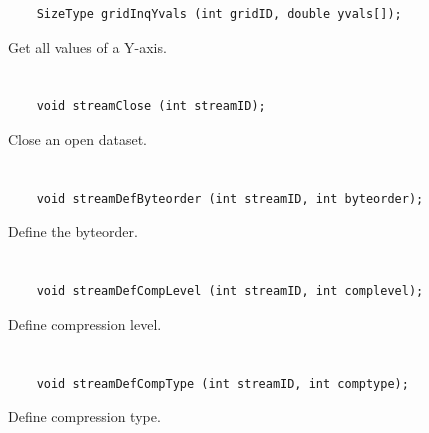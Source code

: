 \begin{verbatim}
    SizeType gridInqYvals (int gridID, double yvals[]);
\end{verbatim}

Get all values of a Y-axis.


\section*{\tt {}}

\begin{verbatim}
    void streamClose (int streamID);
\end{verbatim}

Close an open dataset.


\section*{\tt {}}

\begin{verbatim}
    void streamDefByteorder (int streamID, int byteorder);
\end{verbatim}

Define the byteorder.


\section*{\tt {}}

\begin{verbatim}
    void streamDefCompLevel (int streamID, int complevel);
\end{verbatim}

Define compression level.


\section*{\tt {}}

\begin{verbatim}
    void streamDefCompType (int streamID, int comptype);
\end{verbatim}

Define compression type.


\section*{\tt {}}

